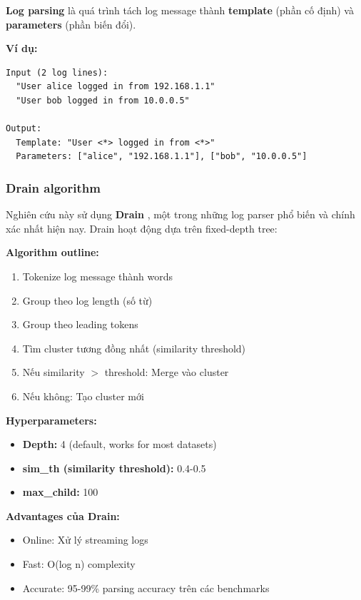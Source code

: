 \textbf{Log parsing} là quá trình tách log message thành \textbf{template} (phần cố định) và \textbf{parameters} (phần biến đổi).

\textbf{Ví dụ:}

\begin{verbatim}
Input (2 log lines):
  "User alice logged in from 192.168.1.1"
  "User bob logged in from 10.0.0.5"

Output:
  Template: "User <*> logged in from <*>"
  Parameters: ["alice", "192.168.1.1"], ["bob", "10.0.0.5"]
\end{verbatim}

\subsubsection{Drain algorithm}

Nghiên cứu này sử dụng \textbf{Drain} \cite{he2017drain}, một trong những log parser phổ biến và chính xác nhất hiện nay. Drain hoạt động dựa trên fixed-depth tree:

\textbf{Algorithm outline:}
\begin{enumerate}
    \item Tokenize log message thành words
    \item Group theo log length (số từ)
    \item Group theo leading tokens
    \item Tìm cluster tương đồng nhất (similarity threshold)
    \item Nếu similarity $>$ threshold: Merge vào cluster
    \item Nếu không: Tạo cluster mới
\end{enumerate}

\textbf{Hyperparameters:}
\begin{itemize}
    \item \textbf{Depth:} 4 (default, works for most datasets)
    \item \textbf{sim\_th (similarity threshold):} 0.4-0.5
    \item \textbf{max\_child:} 100
\end{itemize}

\textbf{Advantages của Drain:}
\begin{itemize}
    \item Online: Xử lý streaming logs
    \item Fast: O(log n) complexity
    \item Accurate: 95-99\% parsing accuracy trên các benchmarks
\end{itemize}

